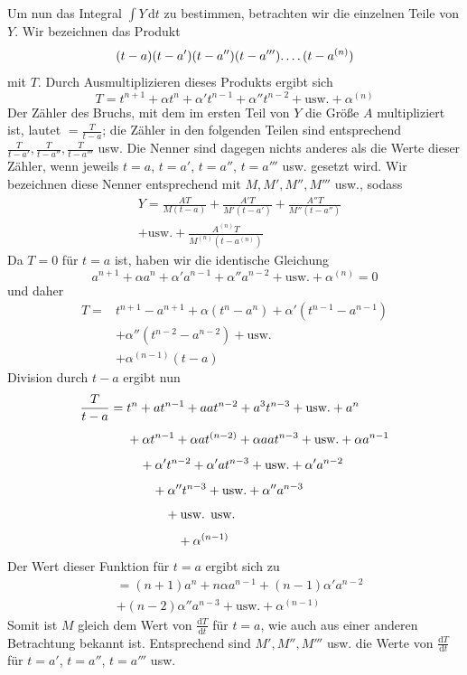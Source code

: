 Um nun das Integral $\int Y\,\mathrm{d}t$ zu bestimmen, betrachten wir die einzelnen Teile von $Y$. Wir bezeichnen das Produkt
\[
(t-a)(t-a')(t-a'')(t-a''')\ldotp\ldotp\ldotp\ldotp(t-a^{(n)})
\]
mit $T$. Durch Ausmultiplizieren dieses Produkts ergibt sich
\[
T=t^{n+1}+\alpha t^n+\alpha't^{n-1}+\alpha''t^{n-2}+\text{usw.}+\alpha^{(n)}
\]
Der Zähler des Bruchs, mit dem im ersten Teil von $Y$ die Größe $A$ multipliziert ist, lautet $=\frac{T}{t-a}$; die Zähler in den folgenden Teilen sind entsprechend $\frac{T}{t-a'},\frac{T}{t-a''},\frac{T}{t-a'''}$ usw. Die Nenner sind dagegen nichts anderes als die Werte dieser Zähler, wenn jeweils $t=a$, $t=a'$, $t=a''$, $t=a'''$ usw. gesetzt wird. Wir bezeichnen diese Nenner entsprechend mit $M,M',M'',M'''$ usw., sodass
\[
\begin{aligned}&Y=\frac{AT}{M(t-a)}+\frac{A'T}{M'(t-a')}+\frac{A''T}{M''(t-a'')}\\ &+\text{usw.}+\frac{A^{(n)}T}{M^{(n)}(t-a^{(n)})}\end{aligned}
\]
Da $T=0$ für $t=a$ ist, haben wir die identische Gleichung
\[
a^{n+1}+\alpha a^n+\alpha'a^{n-1}+\alpha''a^{n-2}+\text{usw.}+\alpha^{(n)}=0
\]
und daher
\[
\begin{aligned}
T={}&t^{n+1}-a^{n+1}+\alpha(t^n-a^n)+\alpha'(t^{n-1}-a^{n-1})
\\ &+\alpha''(t^{n-2}-a^{n-2})+\text{usw.}\\
&+\alpha^{(n-1)}(t-a)
\end{aligned}
\]
Division durch $t-a$ ergibt nun
\[
\begin{aligned}
\frac{T}{t-a}={}&t^n+at^{n-1}+aat^{n-2}+a^3t^{n-3}+\text{usw.}+a^n\\[4pt]
&+\alpha t^{n-1}+\alpha at^{(n-2)}+\alpha aat^{n-3}+\text{usw.}+\alpha a^{n-1}\\[4pt]
&\hspace{1.01em}+\alpha't^{n-2}+\alpha'at^{n-3}+\text{usw.}+\alpha'a^{n-2}\\[4pt]
&\hspace{2.01em}+\alpha''t^{n-3}+\text{usw.}+\alpha''a^{n-3}\\[4pt]
&\hspace{3.01em}+\text{usw. usw.}\\[4pt]
&\hspace{4.01em}+\alpha^{(n-1)}
\end{aligned}
\]
Der Wert dieser Funktion für $t=a$ ergibt sich zu
\[
\begin{aligned}&=(n+1)a^n+n\alpha a^{n-1}+(n-1)\alpha'a^{n-2}\\ &+(n-2)\alpha''a^{n-3}
+\text{usw.}+\alpha^{(n-1)}\end{aligned}
\]
Somit ist $M$ gleich dem Wert von $\frac{\mathrm{d}T}{\mathrm{d}t}$ für $t=a$, wie auch aus einer anderen Betrachtung bekannt ist. Entsprechend sind $M',M'',M'''$ usw. die Werte von $\frac{\mathrm{d}T}{\mathrm{d}t}$ für $t=a'$, $t=a''$, $t=a'''$ usw.

